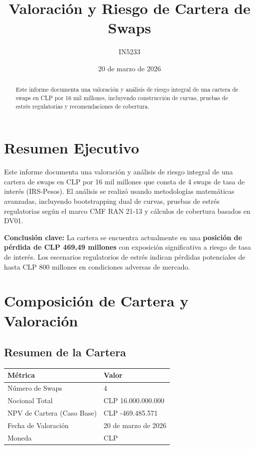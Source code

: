 \documentclass[12pt,a4paper]{article}
\title{Valoración y Riesgo de Cartera de Swaps}
\author{IN5233}
\date{20 de marzo de 2026}
\begin{document}
\maketitle
\thispagestyle{empty}
\clearpage

\begin{abstract}
Este informe documenta una valoración y análisis de riesgo integral de una cartera de swaps en CLP por 16 mil millones, incluyendo construcción de curvas, pruebas de estrés regulatorias y recomendaciones de cobertura.
\end{abstract}

\tableofcontents
\clearpage

\section*{Resumen Ejecutivo}
Este informe documenta una valoración y análisis de riesgo integral de una cartera de swaps en CLP por 16 mil millones que consta de 4 swaps de tasa de interés (IRS-Pesos). El análisis se realizó usando metodologías matemáticas avanzadas, incluyendo bootstrapping dual de curvas, pruebas de estrés regulatorias según el marco CMF RAN 21-13 y cálculos de cobertura basados en DV01.

\textbf{Conclusión clave:} La cartera se encuentra actualmente en una \textbf{posición de pérdida de CLP 469,49 millones} con exposición significativa a riesgo de tasa de interés. Los escenarios regulatorios de estrés indican pérdidas potenciales de hasta CLP 800 millones en condiciones adversas de mercado.

\section{Composición de Cartera y Valoración}
\subsection{Resumen de la Cartera}
\begin{tabular}{ll}
\toprule
Métrica & Valor \\
\midrule
Número de Swaps & 4 \\
Nocional Total & CLP 16.000.000.000 \\
NPV de Cartera (Caso Base) & CLP -469.485.571 \\
Fecha de Valoración & 20 de marzo de 2026 \\
Moneda & CLP \\
\bottomrule
\end{tabular}
\end{document}
